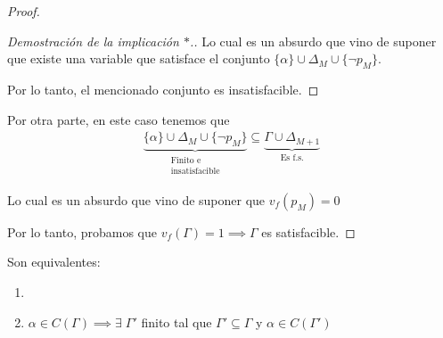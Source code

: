 \begin{itemize}[align=right]
\begin{enumerate}
\begin{proof}
\begin{enumerate}
\begin{proof}[Demostración de la implicación $*$.]
                    Lo cual es un absurdo que vino de suponer que existe una
                    variable que satisface  el conjunto
                    $\{ \alpha \} \cup \Delta_M \cup \{ \neg p_M \}$. 

                    Por lo tanto, el mencionado conjunto es insatisfacible.

                    \end{proof}

                    \bigskip

                    Por otra parte, en este caso tenemos que
                    \begin{gather*}
                        \underbrace{\{ \alpha \} \cup \Delta_M 
                        \cup \{ \neg p_M \}}_{\substack{\text{Finito e} \\
                        \text{insatisfacible}}}
                        \subseteq \underbrace{\Gamma \cup 
                        \Delta_{M+1}}_{\text{Es f.s.}}
                    \end{gather*}

                    Lo cual es un absurdo que vino de suponer que $v_f(p_M)=0$

                \end{enumerate}

                Por lo tanto, probamos que $v_f(\Gamma)= 1 \implies \Gamma$ es
                satisfacible.

                \end{proof}
       \end{enumerate} 
\end{itemize}

\begin{proposicion}{}{}
    Son equivalentes:
    \begin{enumerate}[label=\protect\circled{\arabic*}]
        \item {}
        \item $\alpha \in C(\Gamma) \implies 
            \exists \; \Gamma'$ finito tal que $\Gamma' \subseteq \Gamma$ y
            $\alpha \in C(\Gamma')$
    \end{enumerate}
\end{proposicion}

